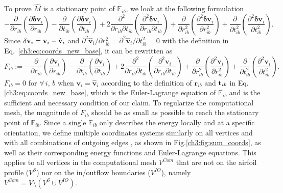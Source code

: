 To prove $\hat{M}$ is a stationary point of $\mathbb{E}_{ib}$, we look at the following formulation
%
\begin{equation}
    - \frac{\partial }{{\partial r_{ib}}}\left(\frac{{\partial \mathbf{\delta v}_i}}{{\partial r_{ib}}}\right) - \frac{\partial }{{\partial t_{ib}}}\left(\frac{{\partial \mathbf{\delta v}_i}}{{\partial t_{ib}}}\right) + 2 \frac{{{\partial ^2}}}{{\partial r_{ib}\partial t_{ib}}}\left(\frac{{{\partial ^2}\mathbf{\delta v}_i}}{{\partial r_{ib}\partial t_{ib}}}\right) + \frac{\partial }{{\partial {r_{ib}^2}}}\left(\frac{{{\partial ^2}\mathbf{\delta v}_i}}{{\partial {r_{ib}^2}}}\right) + \frac{\partial }{{\partial {t_{ib}^2}}}\left(\frac{{{\partial ^2}\mathbf{\delta v}_i}}{{\partial {t_{ib}^2}}}\right).
\end{equation}
Since $\mathbf{\delta v}_i = \mathbf{v}_i - \hat{\mathbf{v}}_i$ and $\partial ^2 \mathbf{\hat{v}}_i / \partial {r_{ib}^2} = \partial ^2 \mathbf{\hat{v}}_i / \partial {t_{ib}^2} = 0$ with the definition in Eq.~\ref{ch3:eq:coords_new_base}, it can be rewritten as
\begin{equation}
    F_{ib} := - \frac{\partial }{{\partial r_{ib}}}\left(\frac{{\partial \mathbf{v}_i}}{{\partial r_{ib}}}\right) - \frac{\partial }{{\partial t_{ib}}}\left(\frac{{\partial \mathbf{v}_i}}{{\partial t_{ib}}}\right) + 2  \frac{{{\partial ^2}}}{{\partial r_{ib}\partial t_{ib}}}\left(\frac{{{\partial ^2}\mathbf{v}_i}}{{\partial r_{ib}\partial t_{ib}}}\right) + \frac{\partial }{{\partial {r_{ib}^2}}}\left(\frac{{{\partial ^2}\mathbf{v}_i}}{{\partial {r_{ib}^2}}}\right) + \frac{\partial }{{\partial {t_{ib}^2}}}\left(\frac{{{\partial ^2}\mathbf{v}_i}}{{\partial {t_{ib}^2}}}\right).
    \label{ch3:eq:euler_lagrange}
\end{equation}
$F_{ib}=0$ for $\forall \, i, \, b$ when $\mathbf{v}_i = \hat{\mathbf{v}}_i$ according to the definition of $\mathbf{r}_{ib}$ and $\mathbf{t}_{ib}$ in Eq.\ref{ch3:eq:coords_new_base}, which is the Euler-Lagrange equation of $\mathbb{E}_{ib}$ and is the sufficient and necessary condition of our claim. 
To regularize the computational mesh, the magnitude of $F_{ib}$ should be as small as possible to reach the stationary point of $\mathbb{E}_{ib}$. 
Since a single $\mathbb{E}_{ib}$ only describes the energy locally and at a specific orientation, we define multiple coordinates systems similarly on all vertices and with all combinations of outgoing edges
, as shown in Fig.\ref{ch3:fig:sum_coords}, as well as their corresponding energy functions and Euler-Lagrange equations.
This applies to all vertices in the computational mesh $V^{Com}$ that are not on the airfoil profile ($V^S$) nor on the in/outflow boundaries ($V^{IO}$), namely $V^{Com}=V \setminus  ({V^S \cup V^{IO}})$.
